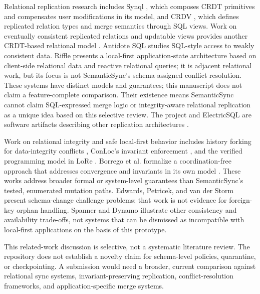 \documentclass[runningheads]{llncs}
\begin{document}
Relational replication research includes Synql \cite{synql2024}, which composes CRDT primitives and compensates user modifications in its model, and CRDV \cite{crdv2025}, which defines replicated relation types and merge semantics through SQL views. Work on eventually consistent replicated relations and updatable views provides another CRDT-based relational model \cite{thomassen2023}. Antidote SQL \cite{antidotesql2018} studies SQL-style access to weakly consistent data. Riffle \cite{riffle2023} presents a local-first application-state architecture based on client-side relational data and reactive relational queries; it is adjacent relational work, but its focus is not SemanticSync's schema-assigned conflict resolution. These systems have distinct models and guarantees; this manuscript does not claim a feature-complete comparison. Their existence means SemanticSync cannot claim SQL-expressed merge logic or integrity-aware relational replication as a unique idea based on this selective review. The \texttt{} project and ElectricSQL are software artifacts describing other replication architectures \cite{crsqlite,electricsql}.

Work on relational integrity and safe local-first behavior includes history forking for data-integrity conflicts \cite{schiefer2022}, ConLoc's invariant enforcement \cite{conloc2025}, and the verified programming model in LoRe \cite{lore2024}. Borrego et al. formalize a coordination-free approach that addresses convergence and invariants in its own model \cite{borrego2025}. These works address broader formal or system-level guarantees than SemanticSync's tested, enumerated mutation paths. Edwards, Petricek, and van der Storm \cite{edwards2023} present schema-change challenge problems; that work is not evidence for foreign-key orphan handling. Spanner and Dynamo \cite{spanner2013,dynamo2007} illustrate other consistency and availability trade-offs, not systems that can be dismissed as incompatible with local-first applications on the basis of this prototype.

This related-work discussion is selective, not a systematic literature review. The repository does not establish a novelty claim for schema-level policies, quarantine, or checkpointing. A submission would need a broader, current comparison against relational sync systems, invariant-preserving replication, conflict-resolution frameworks, and application-specific merge systems.
\end{document}

